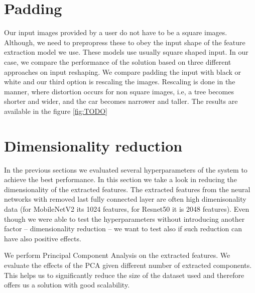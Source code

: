 \section{Padding}

Our input images provided by a user do not have to be a square images. Although, we need to prepropress these to obey the input shape of the feature extraction model we use. These models use usually square shaped input. In our case, we compare the performance of the solution based on three different approaches on input reshaping. We compare padding the input with black or white and our third option is rescaling the images. Rescaling is done in the manner, where distortion occurs for non square images, i.e, a tree becomes shorter and wider, and the car becomes narrower and taller. The results are available in the figure \ref{fig:TODO}

\section{Dimensionality reduction}

In the previous sections we evaluated several hyperparameters of the system to achieve the best performance. In this section we take a look in reducing the dimensionality of the extracted features. The extracted features from the neural networks with removed last fully connected layer are often high dimenisonality data (for MobileNetV2 its 1024 features, for Resnet50 it is 2048 features). Even though we were able to test the hyperparameters without introducing another factor -- dimensionality reduction -- we want to test also if such reduction can have also positive effects.


We perform Principal Component Analysis on the extracted features. We evaluate the effects of the PCA given different number of extracted components. This helps us to significantly reduce the size of the dataset used and therefore offers us a solution with good scalability.

